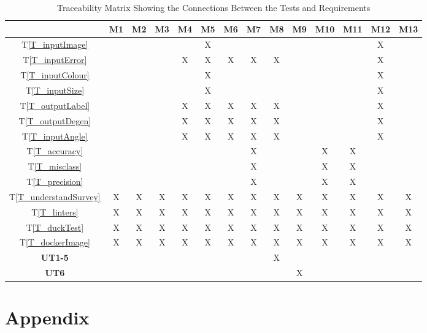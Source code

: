 \documentclass[12pt, titlepage]{article}
\newcommand{\tref}[1]{T\ref{#1}}
\begin{document}
\begin{table}[h!]
  \centering
  \begin{tabular}{|c|c|c|c|c|c|c|c|c|c|c|c|c|c|}
  \hline
    & M1
    & M2
    & M3
    & M4
    & M5
    & M6
    & M7
    & M8
    & M9
    & M10
    & M11
    & M12
    & M13
  \\ \hline
  \tref{T_inputImage}           & & & & &X& & & & & & &X& \\ \hline
  \tref{T_inputError}           & & & &X&X&X&X&X& & & &X& \\ \hline
  \tref{T_inputColour}          & & & & &X& & & & & & &X& \\ \hline
  \tref{T_inputSize}            & & & & &X& & & & & & &X& \\ \hline
  \tref{T_outputLabel}          & & & &X&X&X&X&X& & & &X& \\ \hline
  \tref{T_outputDegen}          & & & &X&X&X&X&X& & & &X& \\ \hline
  \tref{T_inputAngle}           & & & &X&X&X&X&X& & & &X& \\ \hline
  \tref{T_accuracy}             & & & & & & &X& & &X&X& & \\ \hline
  \tref{T_misclass}             & & & & & & &X& & &X&X& & \\ \hline
  \tref{T_precision}            & & & & & & &X& & &X&X& & \\ \hline
  \tref{T_understandSurvey}     &X&X&X&X&X&X&X&X&X&X&X&X&X\\ \hline
  \tref{T_linters}              &X&X&X&X&X&X&X&X&X&X&X&X&X\\ \hline
  \tref{T_duckTest}             &X&X&X&X&X&X&X&X&X&X&X&X&X\\ \hline
  \tref{T_dockerImage}          &X&X&X&X&X&X&X&X&X&X&X&X&X\\ \hline
  \textbf{UT1-5}                & & & & & & & &X& & & & & \\ \hline
  \textbf{UT6}                  & & & & & & & & &X& & & & \\ \hline
  \end{tabular}
  \caption{Traceability Matrix Showing the Connections Between the Tests and Requirements}
  \label{Table:B_trace}
\end{table}
\newpage





\newpage

\section{Appendix}
\end{document}
